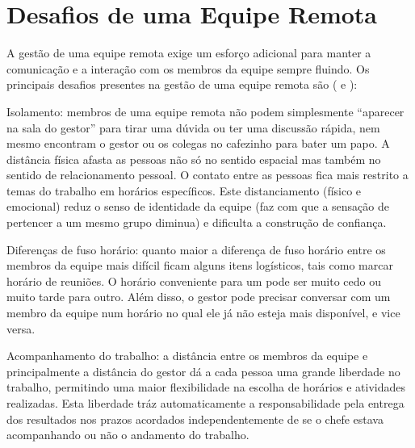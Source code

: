 \documentclass[12pt]{article} %
\begin{document}
\section{\fontsize{12}{12}\textbf{Desafios de uma Equipe Remota}}

A gestão de uma equipe remota exige um esforço adicional
para manter a comunicação e a interação com os membros da equipe sempre fluindo. 
Os principais desafios presentes na gestão de uma equipe remota são (\cite{brake} e \cite{sen}):

\begin{description}
\item{Isolamento:} membros de uma equipe remota não podem
	simplesmente ``aparecer na sala do gestor'' para tirar uma dúvida ou ter uma discussão rápida, nem mesmo
	encontram o gestor ou os colegas no cafezinho para bater um papo. A distância física afasta as pessoas não só no sentido
	espacial mas também no sentido de relacionamento pessoal. O contato entre as
                                                pessoas fica mais restrito a temas do trabalho em horários específicos. Este distanciamento (físico e
							emocional) reduz o senso de identidade da equipe (faz com que a sensação de pertencer a um mesmo
							grupo diminua) e dificulta a construção de confiança. 

\item{Diferenças de fuso horário:} quanto maior a diferença de fuso horário entre os membros da equipe
                                                mais difícil ficam alguns itens logísticos, tais como marcar horário de reuniões. 
                                                O horário conveniente para um pode ser muito cedo ou muito tarde para
                                                outro. Além disso, o gestor pode precisar conversar com um membro da 
                                                equipe num horário no qual ele já não esteja mais disponível, e vice versa.


\item{Acompanhamento do trabalho:} a distância entre os membros da equipe e principalmente a distância do gestor dá a cada
                                                   pessoa uma grande liberdade no trabalho, permitindo uma maior flexibilidade  
		na escolha de horários e atividades realizadas. Esta liberdade tráz automaticamente
                                            a responsabilidade pela entrega dos resultados nos prazos acordados
					independentemente de se o chefe estava acompanhando ou não o andamento do trabalho.
\end{description}
\end{document}
